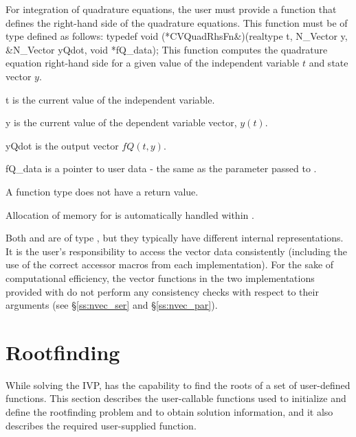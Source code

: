 For integration of quadrature equations, the user must provide a function 
that defines the right-hand side of the quadrature equations. This function
must be of type  defined as follows:
{
  typedef void (*CVQuadRhsFn&)(realtype t, N\_Vector y, \\
                            &N\_Vector yQdot, void *fQ\_data);
}
{
  This function computes the quadrature equation right-hand side for a given value
  of the independent variable $t$ and state vector $y$.
}
{
  \begin{args}[fQ\_data]
  \item[t]
    is the current value of the independent variable.
  \item[y]
    is the current value of the dependent variable vector, $y(t)$.
  \item[yQdot]
    is the output vector $fQ(t,y)$.
  \item[fQ\_data]
    is a pointer to user data - the same as the       
    parameter passed to .   
  \end{args}
}
{
  A  function type does not have a return value.                        
}
{
  Allocation of memory for  is automatically handled within {\cvodes}.

  Both  and  are of type ,
  but they  typically have different internal representations. It is the user's 
  responsibility to access the vector data consistently (including the use of the 
  correct accessor macros from each {\nvector} implementation). For the sake of 
  computational efficiency, the vector functions in the two {\nvector} implementations 
  provided with {\cvodes} do not perform any consistency checks with respect to their 
   arguments (see \S\ref{ss:nvec_ser} and \S\ref{ss:nvec_par}).
}

\section{Rootfinding}\label{s:using_rootfinding}

While solving the IVP, {\cvodes} has the capability to find the
roots of a set of user-defined functions. This section describes the
user-callable functions used to initialize and define the rootfinding
problem and to obtain solution information, and it also describes the
required user-supplied function.

